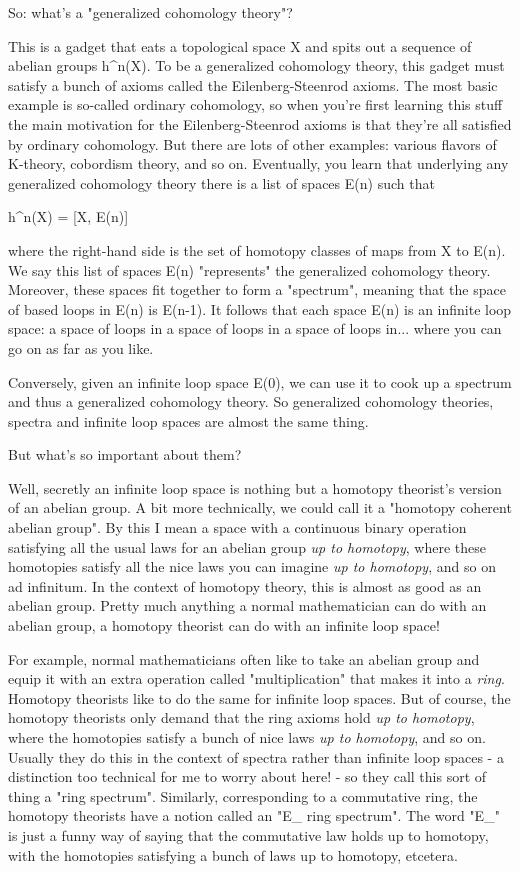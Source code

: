 So: what's a "generalized cohomology theory"?

This is a gadget that eats a topological space X and spits out a sequence 
of abelian groups h^{n}(X).   To be a generalized cohomology theory, this
gadget must satisfy a bunch of axioms called the Eilenberg-Steenrod
axioms.  The most basic example is so-called ordinary cohomology, so
when you're first learning this stuff the main motivation for the
Eilenberg-Steenrod axioms is that they're all satisfied by ordinary
cohomology.   But there are lots of other examples: various flavors of
K-theory, cobordism theory, and so on.  Eventually, you learn that
underlying any generalized cohomology theory there is a list of spaces
E(n) such that

                        h^{n}(X) = [X, E(n)]

where the right-hand side is the set of homotopy classes of maps from X
to E(n).  We say this list of spaces E(n) "represents" the generalized
cohomology theory.  Moreover, these spaces fit together to form a 
"spectrum", meaning that the space of based loops in E(n) is E(n-1).  
It follows that each space E(n) is an infinite loop space: a space of
loops in a space of loops in a space of loops in... where you can go
on as far as you like.  

Conversely, given an infinite loop space E(0), we can use it to cook up 
a spectrum and thus a generalized cohomology theory.  So generalized
cohomology theories, spectra and infinite loop spaces are almost the
same thing.  

But what's so important about them?

Well, secretly an infinite loop space is nothing but a homotopy
theorist's version of an abelian group.  A bit more technically, we
could call it a "homotopy coherent abelian group".  By this I mean a
space with a continuous binary operation satisfying all the usual laws
for an abelian group \emph{up to homotopy}, where these homotopies satisfy
all the nice laws you can imagine \emph{up to homotopy}, and so on ad
infinitum.   In the context of homotopy theory, this is almost as good 
as an abelian group.  Pretty much anything a normal mathematician can do
with an abelian group, a homotopy theorist can do with an infinite loop
space!

For example, normal mathematicians often like to take an abelian group 
and equip it with an extra operation called "multiplication" that
makes it into a \emph{ring}.  Homotopy theorists like to do the same
for infinite loop spaces.  But of course, the homotopy theorists
only demand that the ring axioms hold \emph{up to homotopy}, where the
homotopies satisfy a bunch of nice laws \emph{up to homotopy}, and so on. 
Usually they do this in the context of spectra rather than infinite loop
spaces - a distinction too technical for me to worry about here! - so
they call this sort of thing a "ring spectrum".   Similarly, corresponding
to a commutative ring, the homotopy theorists have a notion called an
"E_{\infty } ring spectrum".  The word 
"E_{\infty }" is just a funny way
of saying that the commutative law holds up to homotopy, with the 
homotopies satisfying a bunch of laws up to homotopy, etcetera. 

